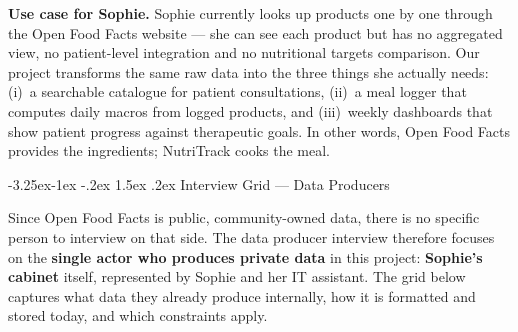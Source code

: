 \documentclass[a4paper,11pt,oneside,openany]{report}
\makeatletter
\renewcommand\subsection{\@startsection{subsection}{2}{\z@}%
  {-3.25ex\@plus -1ex \@minus -.2ex}%
  {1.5ex \@plus .2ex}%
  {\normalfont\large\bfseries\color{ntdarkgreen}}}
\newcommand{\off}{Open Food Facts}
\makeatother
\begin{document}
\textbf{Use case for Sophie.} Sophie currently looks up products
one by one through the \off{} website --- she can see each product
but has no aggregated view, no patient-level integration and no
nutritional targets comparison. Our project transforms the same
raw data into the three things she actually needs: (i)~a
searchable catalogue for patient consultations, (ii)~a meal logger
that computes daily macros from logged products, and (iii)~weekly
dashboards that show patient progress against therapeutic goals.
In other words, \off{} provides the ingredients; NutriTrack cooks
the meal.

\subsection{Interview Grid --- Data Producers}

Since \off{} is public, community-owned data, there is no specific
person to interview on that side. The data producer interview
therefore focuses on the \textbf{single actor who produces private
data} in this project: \textbf{Sophie's cabinet} itself, represented
by Sophie and her IT assistant. The grid below captures what data
they already produce internally, how it is formatted and stored
today, and which constraints apply.
\end{document}

